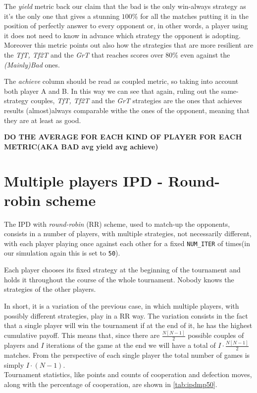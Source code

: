 \documentclass[journal,a4paper,10pt,twoside]{IEEEtran} %
\begin{document}
The \textit{yield} metric back our claim that the bad is the only win-always strategy as it's the only one that gives a stunning $100\%$ for all the matches putting it in the position of perfectly answer to every opponent or, in other words, a player using it does not need to know in advance which strategy the opponent is adopting. Moreover this metric points out also how the strategies that are more resilient are the \textit{TfT, Tf2T} and the \textit{GrT} that reaches scores over $80\%$ even against the  \textit{(Mainly)Bad} ones.

The \textit{achieve} column should be read as coupled metric, so taking into account both player A and B. In this way we can see that again, ruling out the same-strategy couples, \textit{TfT, Tf2T} and the \textit{GrT} strategies are the ones that achieves results (almost)always comparable withe the ones of the opponent, meaning that they are at least as good.

\textbf{DO THE AVERAGE FOR EACH KIND OF PLAYER FOR EACH METRIC(AKA BAD avg yield avg achieve)}

\section{Multiple players IPD - Round-robin scheme} \label{s:IPDMP}
The IPD with \textit{round-robin} (RR) scheme, used to match-up the opponents, consists in a number of players, with multiple strategies, not necessarily different, with each player playing once against each other for a fixed \texttt{NUM\_ITER} of times(in our simulation again this is set to \texttt{50}).

Each player chooses its fixed strategy at the beginning of the tournament and holds it throughout the course of the whole tournament. Nobody knows the strategies of the other players.

In short, it is a variation of the previous case, in which multiple players, with possibly different strategies, play in a RR way. The variation consists in the fact that a single player will win the tournament if at the end of it, he has the highest cumulative payoff. This means that, since there are $\frac{N[N-1]}{2}$ possible couples of players and $I$ iterations of the game at the end we will have a total of $I\cdot\frac{N[N-1]}{2}$ matches. From the perspective of each single player the total number of games is simply $I\cdot(N-1)$.\\

Tournament statistics, like points and counts of cooperation and defection moves, along with the percentage of cooperation, are shown in \autoref{tab:ipdmp50}.
\end{document}
